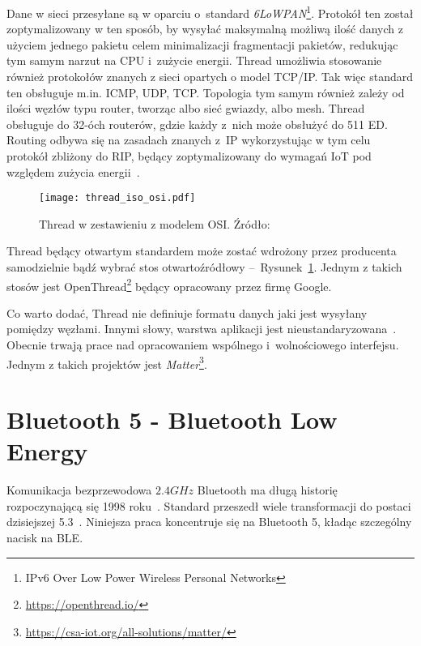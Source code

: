 Dane w sieci przesyłane są w oparciu o~standard \textit{6LoWPAN}\footnote{IPv6 Over Low Power Wireless Personal Networks}.
Protokół ten został zoptymalizowany w ten sposób, by wysyłać maksymalną możliwą ilość danych z użyciem jednego
pakietu celem minimalizacji fragmentacji pakietów, redukując tym samym narzut na CPU i~zużycie energii.
Thread umożliwia stosowanie również protokołów znanych z sieci opartych o model TCP/IP. Tak więc
standard ten obsługuje m.in. \gls{ICMP}, \gls{UDP}, \gls{TCP}. Topologia tym samym również zależy od ilości
węzłów typu router, tworząc albo sieć gwiazdy, albo mesh. Thread obsługuje do 32-óch routerów, gdzie każdy
z~nich może obsłużyć do 511 \gls{ED}. Routing odbywa się na zasadach znanych z~\gls{IP}
wykorzystując w tym celu protokół zbliżony do \gls{RIP}, będący zoptymalizowany do wymagań
IoT pod względem zużycia energii~\cite{silicon_laboratories_ug10311_2022}.

\begin{figure}[!ht]
	\centering \texttt{[image: thread\_iso\_osi.pdf]}
	\caption{Thread w zestawieniu z modelem OSI. Źródło:~\cite{silicon_laboratories_ug10311_2022}}
	\label{rys:thread_iso_comparison_ug10311}
\end{figure}

Thread będący otwartym standardem może zostać wdrożony przez producenta samodzielnie bądź wybrać stos otwartoźródłowy --~Rysunek~\ref{rys:thread_iso_comparison_ug10311}.
Jednym z takich stosów jest OpenThread\footnote{\url{https://openthread.io/}} będący opracowany przez firmę Google.

Co warto dodać, Thread nie definiuje formatu danych jaki jest wysyłany pomiędzy węzłami. Innymi słowy,
warstwa aplikacji jest nieustandaryzowana~\cite{silicon_laboratories_ug10311_2022}. Obecnie trwają
prace nad opracowaniem wspólnego i~wolnościowego interfejsu. Jednym z takich projektów jest \textit{Matter}\footnote{\url{https://csa-iot.org/all-solutions/matter/}}.

\section{Bluetooth 5 - Bluetooth Low Energy}\label{sec:ble}
Komunikacja bezprzewodowa $2.4GHz$ Bluetooth ma długą historię rozpoczynającą się 1998 roku~\cite{noauthor_bluetooth_nodate-1}.
Standard przeszedł wiele transformacji do postaci dzisiejszej 5.3~\cite{woolley_bluetooth_2021}. Niniejsza praca
koncentruje się na Bluetooth 5, kładąc szczególny nacisk na \gls{BLE}.


